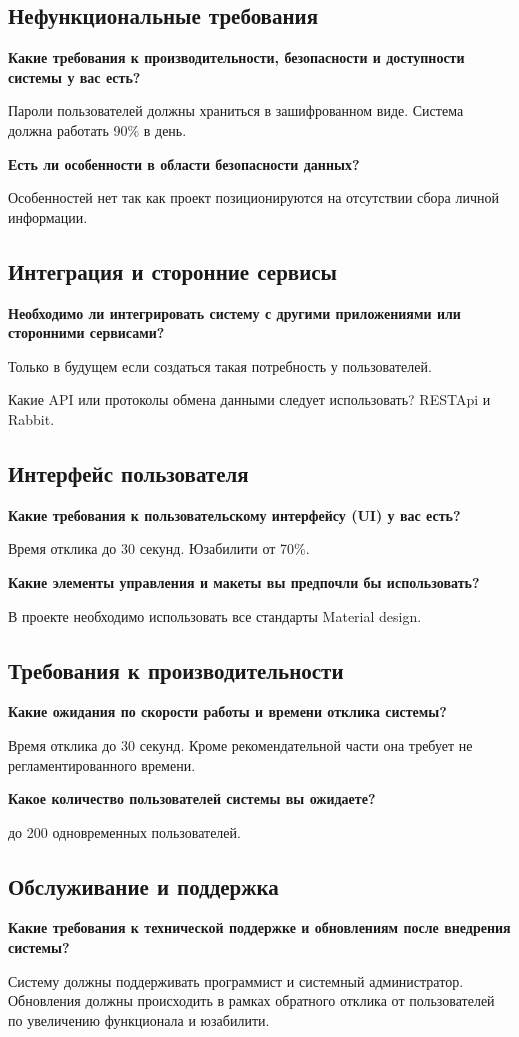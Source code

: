 \subsection{Нефункциональные требования}
\textbf{Какие требования к производительности, безопасности и доступности системы у вас есть?} \par
Пароли пользователей должны храниться в зашифрованном виде.
Система должна работать 90\% в день.
\par
\textbf{Есть ли особенности в области безопасности данных?} \par
Особенностей нет так как проект позиционируются на отсутствии сбора личной информации.

\subsection{Интеграция и сторонние сервисы}
\textbf{Необходимо ли интегрировать систему с другими приложениями или сторонними сервисами?} \par
Только в будущем если создаться такая потребность у пользователей.
\par
Какие API или протоколы обмена данными следует использовать?
RESTApi и Rabbit.

\subsection{Интерфейс пользователя}
\textbf{Какие требования к пользовательскому интерфейсу (UI) у вас есть?} \par
Время отклика до 30 секунд.
Юзабилити от 70\%.
\par
\textbf{Какие элементы управления и макеты вы предпочли бы использовать?} \par
В проекте необходимо использовать все стандарты Material design.

\subsection{Требования к производительности}
\textbf{Какие ожидания по скорости работы и времени отклика системы?} \par
Время отклика до 30 секунд.
Кроме рекомендательной части она требует не регламентированного времени.
\par
\textbf{Какое количество пользователей системы вы ожидаете?} \par
до 200 одновременных пользователей.


\subsection{Обслуживание и поддержка}
\textbf{Какие требования к технической поддержке и обновлениям после внедрения системы?} \par
Систему должны поддерживать программист и системный администратор.
Обновления должны происходить в рамках обратного отклика от пользователей по увеличению функционала и юзабилити.

